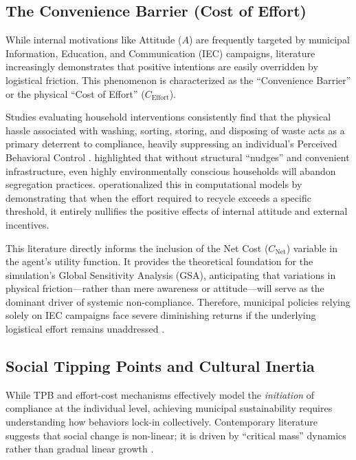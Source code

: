 \subsection{The Convenience Barrier (Cost of Effort)}

While internal motivations like Attitude ($A$) are frequently targeted by municipal Information, Education, and Communication (IEC) campaigns, literature increasingly demonstrates that positive intentions are easily overridden by logistical friction. This phenomenon is characterized as the ``Convenience Barrier'' or the physical ``Cost of Effort'' ($C_{\mathrm{Effort}}$). 

Studies evaluating household interventions consistently find that the physical hassle associated with washing, sorting, storing, and disposing of waste acts as a primary deterrent to compliance, heavily suppressing an individual's Perceived Behavioral Control \citep{Trushna2024, Moeini2023}. \citet{LoanBalanay2023} highlighted that without structural ``nudges'' and convenient infrastructure, even highly environmentally conscious households will abandon segregation practices. \citet{Meng2018} operationalized this in computational models by demonstrating that when the effort required to recycle exceeds a specific threshold, it entirely nullifies the positive effects of internal attitude and external incentives.

This literature directly informs the inclusion of the Net Cost ($C_{\mathrm{Net}}$) variable in the agent's utility function. It provides the theoretical foundation for the simulation's Global Sensitivity Analysis (GSA), anticipating that variations in physical friction—rather than mere awareness or attitude—will serve as the dominant driver of systemic non-compliance. Therefore, municipal policies relying solely on IEC campaigns face severe diminishing returns if the underlying logistical effort remains unaddressed \citep{Moeini2023}.

\subsection{Social Tipping Points and Cultural Inertia}

While TPB and effort-cost mechanisms effectively model the \textit{initiation} of compliance at the individual level, achieving municipal sustainability requires understanding how behaviors lock-in collectively. Contemporary literature suggests that social change is non-linear; it is driven by ``critical mass'' dynamics rather than gradual linear growth \citep{Nyborg2016}.

